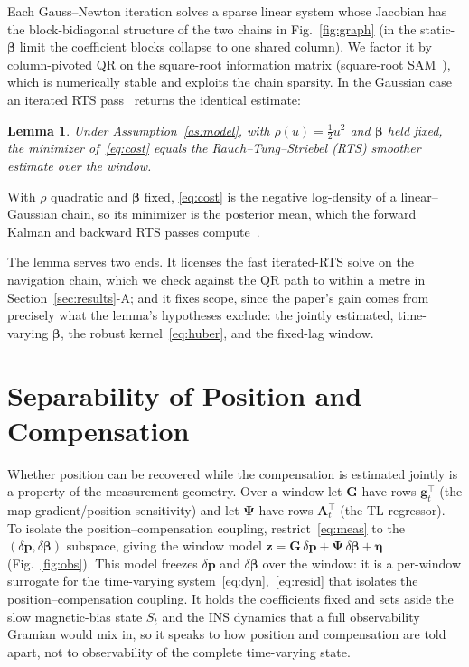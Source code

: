 \documentclass{IEEEtaes}
\newtheorem{lemma}{Lemma}
\begin{document}
Each Gauss--Newton iteration solves a sparse linear system whose Jacobian has the
block-bidiagonal structure of the two chains in Fig.~\ref{fig:graph} (in the
static-$\boldsymbol{\beta}$ limit the coefficient blocks collapse to one shared
column). We factor it
by column-pivoted QR on the square-root information matrix (square-root
SAM~\cite{dellaert2006,dellaert2017}), which is numerically stable and exploits the
chain sparsity. In the Gaussian case an iterated RTS pass~\cite{rauch1965} returns
the identical estimate:

\begin{lemma}\label{lem:rts}
Under Assumption~\ref{as:model}, with $\rho(u)=\tfrac12u^2$ and $\boldsymbol{\beta}$
held fixed, the minimizer of~\eqref{eq:cost} equals the Rauch--Tung--Striebel (RTS)
smoother estimate over the window.
\end{lemma}
\begin{IEEEproof}
With $\rho$ quadratic and $\boldsymbol{\beta}$ fixed, \eqref{eq:cost} is the
negative log-density of a linear--Gaussian chain, so its minimizer is the posterior
mean, which the forward Kalman and backward RTS passes
compute~\cite{rauch1965}.
\end{IEEEproof}

The lemma serves two ends. It licenses the fast iterated-RTS solve on the
navigation chain, which we check against the QR path to within a metre in
Section~\ref{sec:results}-A; and it fixes scope, since the paper's gain comes from
precisely what the lemma's hypotheses exclude: the jointly estimated, time-varying
$\boldsymbol{\beta}$, the robust kernel~\eqref{eq:huber}, and the fixed-lag window.

\section{Separability of Position and Compensation}
\label{sec:observability}
Whether position can be recovered while the compensation is estimated jointly is a
property of the measurement geometry. Over a window let $\mathbf{G}$ have rows
$\mathbf{g}_t^{\!\top}$ (the map-gradient/position sensitivity) and let
$\boldsymbol{\Psi}$ have rows $\mathbf{A}_t^{\!\top}$ (the TL regressor). To
isolate the position--compensation coupling, restrict~\eqref{eq:meas} to the
$(\delta\mathbf{p},\delta\boldsymbol{\beta})$ subspace, giving the window model
$\mathbf{z}=\mathbf{G}\,\delta\mathbf{p}+\boldsymbol{\Psi}\,\delta\boldsymbol{\beta}+\boldsymbol{\eta}$
(Fig.~\ref{fig:obs}). This model freezes $\delta\mathbf{p}$ and
$\delta\boldsymbol{\beta}$ over the window: it is a per-window surrogate for the
time-varying system~\eqref{eq:dyn},~\eqref{eq:resid} that isolates the
position--compensation coupling. It holds the coefficients fixed and sets aside the
slow magnetic-bias state $S_t$ and the INS dynamics that a full observability Gramian
would mix in, so it speaks to how position and compensation are told apart, not to
observability of the complete time-varying state.
\end{document}
